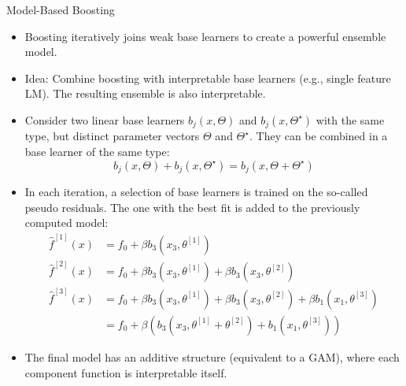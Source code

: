 \documentclass[11pt,compress,t,notes=noshow, xcolor=table]{beamer}
\begin{document}
\begin{vbframe}{Model-Based Boosting}

\begin{itemize}
\setlength\itemsep{2em}
\item 
Boosting iteratively joins weak base learners to create a powerful ensemble model.
\item 
Idea: Combine boosting with interpretable base learners (e.g., single feature LM). The resulting ensemble is also interpretable.
\item
Consider two linear base learners $b_j(x, \Theta)$ and $b_j(x, \Theta^{\star})$ with the same type, but distinct parameter vectors $\Theta$ and $\Theta^{\star}$. They can be combined in a base learner of the same type:
$$
b_j(x, \Theta) + b_j(x, \Theta^{\star}) = b_j(x, \Theta + \Theta^{\star})
$$
\item In each iteration, a selection of base learners is trained on the so-called pseudo residuals. The one with the best fit is added to the previously computed model:
\medskip
\begin{align*}
\widehat{f}^{[1]}(x) &= f_0 + \beta b_3(x_3, \theta^{[1]}) \\
\widehat{f}^{[2]}(x) &= f_0 + \beta b_3(x_3, \theta^{[1]}) + \beta b_3(x_3, \theta^{[2]})\\
\widehat{f}^{[3]}(x) &= f_0 + \beta b_3(x_3, \theta^{[1]}) + \beta b_3(x_3, \theta^{[2]}) + \beta b_1(x_1, \theta^{[3]}) \\
&= f_0 + \beta \left(b_3(x_3, \theta^{[1]} + \theta^{[2]}) + b_1(x_1, \theta^{[3]})\right)
\end{align*}

\item The final model has an additive structure (equivalent to a GAM), where each component function is interpretable itself.

\end{itemize}
\end{vbframe}





\end{document}
